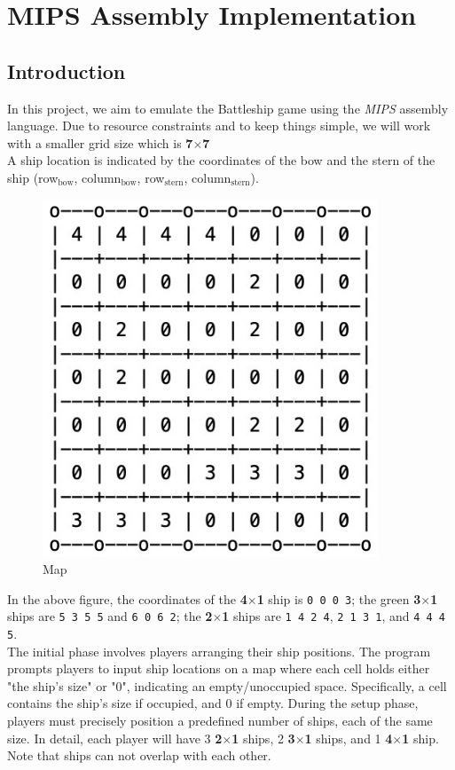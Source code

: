 \section{MIPS Assembly Implementation}
\subsection{Introduction}
\qquad In this project, we aim to emulate the Battleship game using the \textit{MIPS} assembly language. Due to resource constraints and to keep things simple, we will work with a smaller grid size which is \textbf{7$\times$7} \\

\qquad A ship location is indicated by the
coordinates of the bow and the stern of the ship (row$_{\text{bow}}$, column$_{\text{bow}}$, row$_{\text{stern}}$, column$_{\text{stern}}$). 

\begin{figure}[H]
    \centering
    \includegraphics[width=10cm]{graphics/intromap.jpg}
    \caption{Map}
\end{figure}

In the above figure, the coordinates of the \textbf{4$\times$1} ship is \texttt{0 0 0 3}; the green \textbf{3$\times$1} ships are \texttt{5 3 5 5} and \texttt{6 0 6 2}; the \textbf{2$\times$1} ships are \texttt{1 4 2 4},   \texttt{2 1 3 1}, and \texttt{4 4 4 5}. \\

\qquad The initial phase involves players arranging their ship positions. The program prompts players to input ship locations on a map where each cell holds either "the ship's size" or "0", indicating an empty/unoccupied space. Specifically, a cell contains the ship's size if occupied, and 0 if empty. During the setup phase, players must precisely position a predefined number of ships, each of the same size. In detail, each player will have 3 \textbf{2$\times$1} ships, 2 \textbf{3$\times$1} ships, and 1 \textbf{4$\times$1} ship. Note that ships can not overlap with each other.


